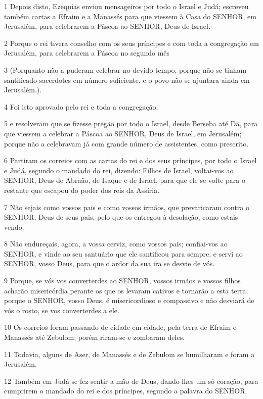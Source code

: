 \par 1 Depois disto, Ezequias enviou mensageiros por todo o Israel e Judá; escreveu também cartas a Efraim e a Manassés para que viessem à Casa do SENHOR, em Jerusalém, para celebrarem a Páscoa ao SENHOR, Deus de Israel.
\par 2 Porque o rei tivera conselho com os seus príncipes e com toda a congregação em Jerusalém, para celebrarem a Páscoa no segundo mês
\par 3 (Porquanto não a puderam celebrar no devido tempo, porque não se tinham santificado sacerdotes em número suficiente, e o povo não se ajuntara ainda em Jerusalém.).
\par 4 Foi isto aprovado pelo rei e toda a congregação;
\par 5 e resolveram que se fizesse pregão por todo o Israel, desde Berseba até Dã, para que viessem a celebrar a Páscoa ao SENHOR, Deus de Israel, em Jerusalém; porque não a celebravam já com grande número de assistentes, como prescrito.
\par 6 Partiram os correios com as cartas do rei e dos seus príncipes, por todo o Israel e Judá, segundo o mandado do rei, dizendo: Filhos de Israel, voltai-vos ao SENHOR, Deus de Abraão, de Isaque e de Israel, para que ele se volte para o restante que escapou do poder dos reis da Assíria.
\par 7 Não sejais como vossos pais e como vossos irmãos, que prevaricaram contra o SENHOR, Deus de seus pais, pelo que os entregou à desolação, como estais vendo.
\par 8 Não endureçais, agora, a vossa cerviz, como vossos pais; confiai-vos ao SENHOR, e vinde ao seu santuário que ele santificou para sempre, e servi ao SENHOR, vosso Deus, para que o ardor da sua ira se desvie de vós.
\par 9 Porque, se vós vos converterdes ao SENHOR, vossos irmãos e vossos filhos acharão misericórdia perante os que os levaram cativos e tornarão a esta terra; porque o SENHOR, vosso Deus, é misericordioso e compassivo e não desviará de vós o rosto, se vos converterdes a ele.
\par 10 Os correios foram passando de cidade em cidade, pela terra de Efraim e Manassés até Zebulom; porém riram-se e zombaram deles.
\par 11 Todavia, alguns de Aser, de Manassés e de Zebulom se humilharam e foram a Jerusalém.
\par 12 Também em Judá se fez sentir a mão de Deus, dando-lhes um só coração, para cumprirem o mandado do rei e dos príncipes, segundo a palavra do SENHOR.

